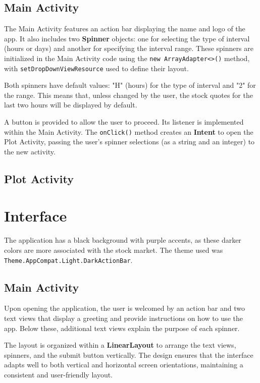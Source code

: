 \documentclass{article}
\begin{document}
\subsection{Main Activity}
The Main Activity features an action bar displaying the name and logo of the app. 
It also includes two \textbf{Spinner} objects: one for selecting the type of interval (hours or days) and another for specifying the interval range. 
These spinners are initialized in the Main Activity code using the \texttt{new ArrayAdapter<>()} method, with \texttt{setDropDownViewResource} used to define their layout.

Both spinners have default values: "H" (hours) for the type of interval and "2" for the range. 
This means that, unless changed by the user, the stock quotes for the last two hours will be displayed by default.

A button is provided to allow the user to proceed. Its listener is implemented within the Main Activity. The \texttt{onClick()} method creates an \textbf{Intent} to open the Plot Activity, passing the user's spinner selections (as a string and an integer) to the new activity.

\subsection{Plot Activity}

\section{Interface}
The application has a black background with purple accents, as these darker colors are more associated with the stock market. The theme used was \texttt{Theme.AppCompat.Light.DarkActionBar}.

\subsection{Main Activity}
Upon opening the application, the user is welcomed by an action bar and two text views that display a greeting and provide instructions on how to use the app. Below these, additional text views explain the purpose of each spinner.

The layout is organized within a \textbf{LinearLayout} to arrange the text views, spinners, and the submit button vertically. The design ensures that the interface adapts well to both vertical and horizontal screen orientations, maintaining a consistent and user-friendly layout.
\end{document}
